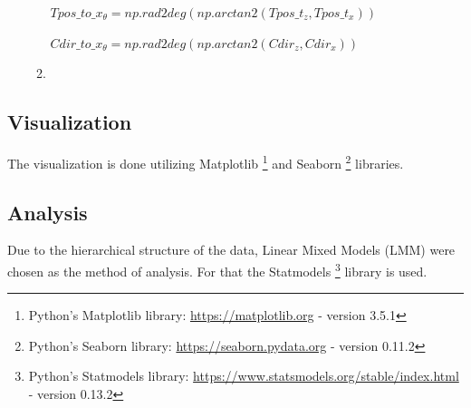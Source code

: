 \begin{enumerate}
\begin{enumerate}
		\begin{center}
			$Tpos\_to\_x_{\theta} = np.rad2deg(np.arctan2(Tpos\_t_{z}, Tpos\_t_{x}))$
		\end{center}
	
		\begin{center}
			$Cdir\_to\_x_{\theta} = np.rad2deg(np.arctan2(Cdir_{z}, Cdir_{x}))$
		\end{center}
		
		\item {}
	\end{enumerate}
\end{enumerate}


\subsection{Visualization}

The visualization is done utilizing Matplotlib \footnote{Python's Matplotlib library: \href{https://matplotlib.org}{https://matplotlib.org} - version 3.5.1} and Seaborn \footnote{Python's Seaborn library: \href{https://seaborn.pydata.org}{https://seaborn.pydata.org} - version 0.11.2} libraries.

\subsection{Analysis}
Due to the hierarchical structure of the data, Linear Mixed Models (LMM) were chosen as the method of analysis. For that the Statmodels \footnote{Python's Statmodels library: \href{https://www.statsmodels.org/stable/index.html}{https://www.statsmodels.org/stable/index.html} - version 0.13.2} library is used.


